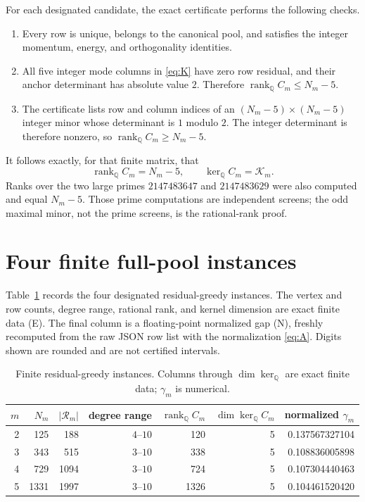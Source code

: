 \documentclass[11pt]{article}
\theoremstyle{definition}
\theoremstyle{remark}
\begin{document}
For each designated candidate, the exact certificate performs the following
checks.
\begin{enumerate}
\item Every row is unique, belongs to the canonical pool, and satisfies the
integer momentum, energy, and orthogonality identities.
\item All five integer mode columns in \eqref{eq:K} have zero row residual,
and their anchor determinant has absolute value $2$.  Therefore
$\operatorname{rank}_{\mathbb Q}C_m\leq N_m-5$.
\item The certificate lists row and column indices of an
$(N_m-5)\times(N_m-5)$ integer minor whose determinant is $1$ modulo $2$.
The integer determinant is therefore nonzero, so
$\operatorname{rank}_{\mathbb Q}C_m\geq N_m-5$.
\end{enumerate}
It follows exactly, for that finite matrix, that
\[
 \operatorname{rank}_{\mathbb Q}C_m=N_m-5,
 \qquad \ker_{\mathbb Q}C_m=\mathcal K_m.
\]
Ranks over the two large primes $2147483647$ and $2147483629$ were also
computed and equal $N_m-5$.  Those prime computations are independent
screens; the odd maximal minor, not the prime screens, is the rational-rank
proof.

\section{Four finite full-pool instances}\label{sec:finite}

Table~\ref{tab:candidates} records the four designated residual-greedy
instances.  The vertex and row counts, degree range, rational rank, and
kernel dimension are exact finite data (E).  The final column is a
floating-point normalized gap (N), freshly recomputed from the raw JSON row
list with the normalization \eqref{eq:A}.  Digits shown are rounded and are
not certified intervals.

\begin{table}[ht]
\centering
\small
\caption{Finite residual-greedy instances.  Columns through
$\dim\ker_{\mathbb Q}$ are exact finite data; $\gamma_m$ is numerical.}
\label{tab:candidates}
\begin{tabular}{@{}rrrrrrr@{}}
\toprule
$m$ & $N_m$ & $|\mathcal R_m|$ & degree range &
$\operatorname{rank}_{\mathbb Q}C_m$ & $\dim\ker_{\mathbb Q}C_m$ &
normalized $\gamma_m$ \\
\midrule
2 & 125  & 188  & $4$--$10$ & 120  & 5 & 0.137567327104 \\
3 & 343  & 515  & $3$--$10$ & 338  & 5 & 0.108836005898 \\
4 & 729  & 1094 & $3$--$10$ & 724  & 5 & 0.107304440463 \\
5 & 1331 & 1997 & $3$--$10$ & 1326 & 5 & 0.104461520420 \\
\bottomrule
\end{tabular}
\end{table}
\end{document}
